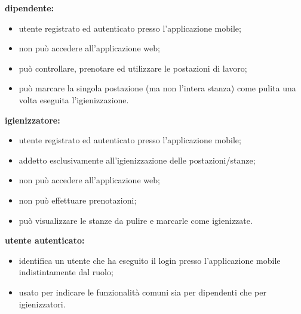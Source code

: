 

    \item \textbf{dipendente:}
    \begin{itemize}
        \item utente registrato ed autenticato presso l'applicazione mobile; 
        \item non può accedere all'applicazione web;
        \item può controllare, prenotare ed utilizzare le postazioni di lavoro;
        \item può marcare la singola postazione (ma non l'intera stanza) come pulita una volta eseguita l'igienizzazione.
    \end{itemize}

    \item \textbf{igienizzatore:}
    \begin{itemize}
        \item utente registrato ed autenticato presso l'applicazione mobile;
        \item addetto esclusivamente all'igienizzazione delle postazioni/stanze; 
        \item non può accedere all'applicazione web;
        \item non può effettuare prenotazioni;
        \item può visualizzare le stanze da pulire e marcarle come igienizzate.
    \end{itemize} 
   
    \item \textbf{utente autenticato:}
    \begin{itemize}
        \item identifica un utente che ha eseguito il login presso l'applicazione mobile indistintamente dal ruolo;
        \item usato per indicare le funzionalità comuni sia per dipendenti che per igienizzatori.
\end{itemize}

